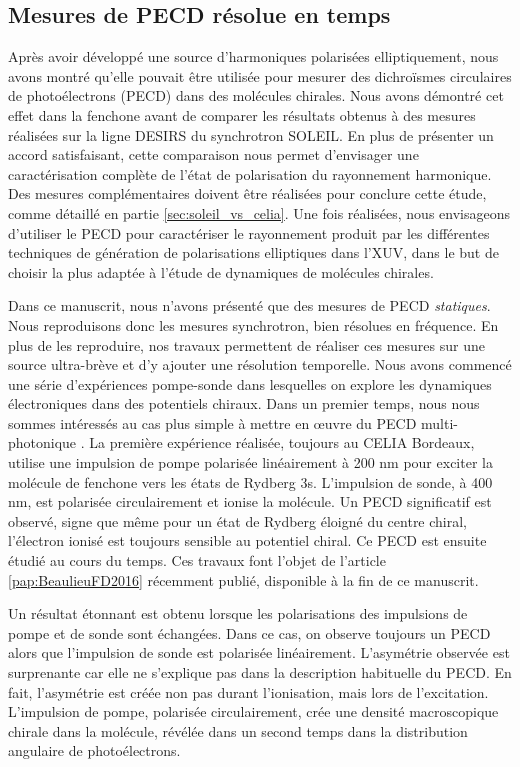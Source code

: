 \subsection{Mesures de PECD résolue en temps}
Après avoir développé une source d'harmoniques polarisées elliptiquement, nous avons montré qu'elle pouvait être utilisée pour mesurer des dichroïsmes circulaires de photoélectrons (PECD) dans des molécules chirales. Nous avons démontré cet effet dans la fenchone avant de comparer les résultats obtenus à des mesures réalisées sur la ligne DESIRS du synchrotron SOLEIL. En plus de présenter un accord satisfaisant, cette comparaison nous permet d'envisager une caractérisation complète de l'état de polarisation du rayonnement harmonique. Des mesures complémentaires doivent être réalisées pour conclure cette étude, comme détaillé en partie \ref{sec:soleil_vs_celia}. Une fois réalisées, nous envisageons d'utiliser le PECD pour caractériser le rayonnement produit par les différentes techniques de génération de polarisations elliptiques dans l'XUV, dans le but de choisir la plus adaptée à l'étude de dynamiques de molécules chirales.

Dans ce manuscrit, nous n'avons présenté que des mesures de PECD \textit{statiques}. Nous reproduisons donc les mesures synchrotron, bien résolues en fréquence. En plus de les reproduire, nos travaux permettent de réaliser ces mesures sur une source ultra-brève et d'y ajouter une résolution temporelle. Nous avons commencé une série d'expériences pompe-sonde dans lesquelles on explore les dynamiques électroniques dans des potentiels chiraux. Dans un premier temps, nous nous sommes intéressés au cas plus simple à mettre en œuvre du PECD multi-photonique . La première expérience réalisée, toujours au CELIA Bordeaux, utilise une impulsion de pompe polarisée linéairement à 200 nm pour exciter la molécule de fenchone vers les états de Rydberg 3s. L'impulsion de sonde, à 400 nm, est polarisée circulairement et ionise la molécule. Un PECD significatif est observé, signe que même pour un état de Rydberg éloigné du centre chiral, l'électron ionisé est toujours sensible au potentiel chiral. Ce PECD est ensuite étudié au cours du temps. Ces travaux font l'objet de l'article \ref{pap:BeaulieuFD2016} récemment publié, disponible à la fin de ce manuscrit.

Un résultat étonnant est obtenu lorsque les polarisations des impulsions de pompe et de sonde sont échangées. Dans ce cas, on observe toujours un PECD alors que l'impulsion de sonde est polarisée linéairement. L'asymétrie observée est surprenante car elle ne s'explique pas dans la description habituelle du PECD. En fait, l'asymétrie est créée non pas durant l'ionisation, mais lors de l'excitation. L'impulsion de pompe, polarisée circulairement, crée une densité macroscopique chirale dans la molécule, révélée dans un second temps dans la distribution angulaire de photoélectrons. 

